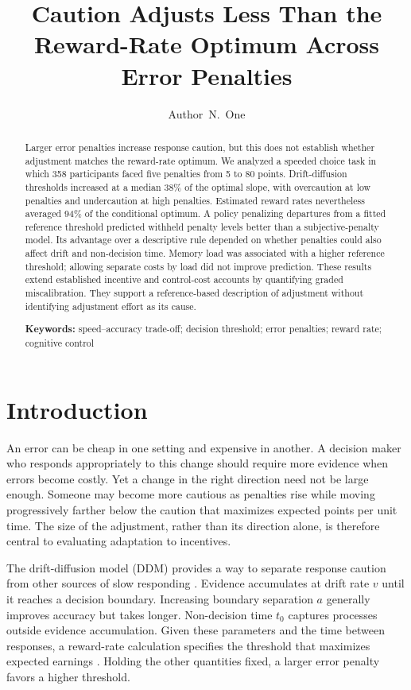 \documentclass[10pt,letterpaper]{article}
\title{Caution Adjusts Less Than the Reward-Rate Optimum Across Error Penalties}
\author[1]{\mbox{Author N. One}}
\affil[1]{Department, University}
\begin{document}
\maketitle
\begin{abstract}
Larger error penalties increase response caution, but this does not establish whether adjustment matches the reward-rate optimum. We analyzed a speeded choice task in which 358 participants faced five penalties from 5 to 80 points. Drift-diffusion thresholds increased at a median 38\% of the optimal slope, with overcaution at low penalties and undercaution at high penalties. Estimated reward rates nevertheless averaged 94\% of the conditional optimum. A policy penalizing departures from a fitted reference threshold predicted withheld penalty levels better than a subjective-penalty model. Its advantage over a descriptive rule depended on whether penalties could also affect drift and non-decision time. Memory load was associated with a higher reference threshold; allowing separate costs by load did not improve prediction. These results extend established incentive and control-cost accounts by quantifying graded miscalibration. They support a reference-based description of adjustment without identifying adjustment effort as its cause.

\textbf{Keywords:} speed--accuracy trade-off; decision threshold; error penalties; reward rate; cognitive control
\end{abstract}

\section{Introduction}
An error can be cheap in one setting and expensive in another. A decision maker who responds appropriately to this change should require more evidence when errors become costly. Yet a change in the right direction need not be large enough. Someone may become more cautious as penalties rise while moving progressively farther below the caution that maximizes expected points per unit time. The size of the adjustment, rather than its direction alone, is therefore central to evaluating adaptation to incentives.

The drift-diffusion model (DDM) provides a way to separate response caution from other sources of slow responding \citep{ratcliff1978,ratcliff2008}. Evidence accumulates at drift rate $v$ until it reaches a decision boundary. Increasing boundary separation $a$ generally improves accuracy but takes longer. Non-decision time $t_0$ captures processes outside evidence accumulation. Given these parameters and the time between responses, a reward-rate calculation specifies the threshold that maximizes expected earnings \citep{bogacz2006}. Holding the other quantities fixed, a larger error penalty favors a higher threshold.
\end{document}
